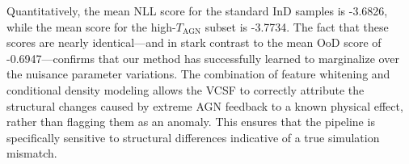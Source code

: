 \documentclass[]{article}
\begin{document}
Quantitatively, the mean NLL score for the standard InD samples is -3.6826, while the mean score for the high-$T_{\text{AGN}}$ subset is -3.7734. The fact that these scores are nearly identical—and in stark contrast to the mean OoD score of -0.6947—confirms that our method has successfully learned to marginalize over the nuisance parameter variations. The combination of feature whitening and conditional density modeling allows the VCSF to correctly attribute the structural changes caused by extreme AGN feedback to a known physical effect, rather than flagging them as an anomaly. This ensures that the pipeline is specifically sensitive to structural differences indicative of a true simulation mismatch.
\end{document}

